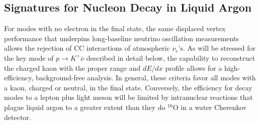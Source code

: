 
 
\subsection{Signatures for Nucleon Decay in Liquid Argon}

For modes with no
electron in the final state, the same displaced vertex performance
that underpins long-baseline neutrino oscillation measurements allows
the rejection of CC interactions of atmospheric $\nu_e$'s.
As will be stressed for the key mode of $p \rightarrow K^+ \overline{\nu}$
described in detail below, the capability to reconstruct the charged
kaon with the proper range and $dE/dx$ profile allows for a high-efficiency,
background-free analysis.  In general, these criteria favor all
modes with a kaon, charged or neutral, in the final state. Conversely,
the efficiency for decay modes to a lepton plus light meson will be
limited by intranuclear reactions that plague liquid argon to a greater extent
than they do $^{\mathrm{16}}$O in a water Cherenkov detector.

